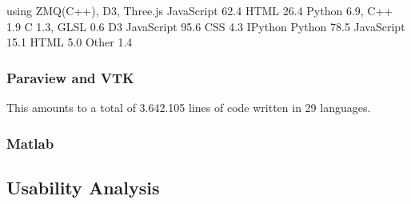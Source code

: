 using ZMQ(C++), D3, 
Three.js
JavaScript 62.4	 HTML 26.4	 Python 6.9,	 C++ 1.9	 C 1.3,	 GLSL 0.6
D3
JavaScript 95.6	 CSS 4.3
IPython
Python 78.5	 JavaScript 15.1	 HTML 5.0	 Other 1.4

\subsubsection{Paraview and VTK}



This amounts to a total of 3.642.105 lines of code written in 29 languages.

\subsubsection{Matlab}



\subsection{Usability Analysis}
